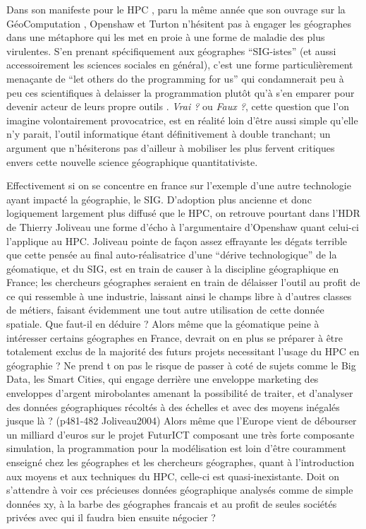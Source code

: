 Dans son manifeste pour le HPC \autocite[2]{Openshaw2000}, paru la même année que son ouvrage sur la GéoComputation \autocite{Openshaw2000b}, Openshaw et Turton n’hésitent pas à engager les géographes dans une métaphore qui les met en proie à une forme de maladie des plus virulentes. S'en prenant spécifiquement aux géographes \enquote{SIG-istes} (et aussi accessoirement les sciences sociales en général), c’est une forme particulièrement menaçante de \foreignquote{english}{let others do the programming for us} qui condamnerait peu à peu ces scientifiques à delaisser la programmation plutôt qu’à s’en emparer pour devenir acteur de leurs propre outils . \textit{Vrai ?} ou \textit{Faux ?}, cette question que l'on imagine volontairement provocatrice, est en réalité loin d'être aussi simple qu'elle n'y parait, l'outil informatique étant définitivement à double tranchant; un argument que n'hésiterons pas d'ailleur à mobiliser les plus fervent critiques envers cette nouvelle science géographique quantitativiste. 

Effectivement si on se concentre en france sur l'exemple d'une autre technologie ayant impacté la géographie, le SIG. D’adoption plus ancienne et donc logiquement largement plus diffusé que le HPC, on retrouve pourtant dans l'HDR de Thierry Joliveau une forme d'écho à l'argumentaire d'Openshaw quant celui-ci l'applique au HPC. Joliveau pointe de façon assez effrayante les dégats terrible que cette pensée au final auto-réalisatrice d’une \enquote{dérive technologique} de la géomatique, et du SIG, est en train de causer à la discipline géographique en France; les chercheurs géographes seraient en train de délaisser l'outil au profit de ce qui ressemble à une industrie, laissant ainsi le champs libre à d'autres classes de métiers, faisant évidemment une tout autre utilisation de cette donnée spatiale. Que faut-il en déduire ? Alors même que la géomatique peine à intéresser certains géographes en France, devrait on en plus se préparer à être totalement exclus de la majorité des futurs projets necessitant l’usage du HPC en géographie ? Ne prend t on pas le risque de passer à coté de sujets comme le Big Data, les Smart Cities, qui engage derrière une enveloppe marketing des enveloppes d'argent mirobolantes amenant la possibilité  de traiter, et d’analyser des données géographiques récoltés à des échelles et avec des moyens inégalés jusque là ? (p481-482 Joliveau2004) Alors même que l’Europe vient de débourser un milliard d’euros sur le projet FuturICT composant une très forte composante simulation, la programmation pour la modélisation est loin d’être couramment enseigné chez les géographes et les chercheurs géographes, quant à l'introduction aux moyens et aux techniques du HPC, celle-ci est quasi-inexistante. Doit on s’attendre à voir ces précieuses données géographique analysés comme de simple données xy, à la barbe des géographes francais et au profit de seules sociétés privées avec qui il faudra bien ensuite négocier ? 

